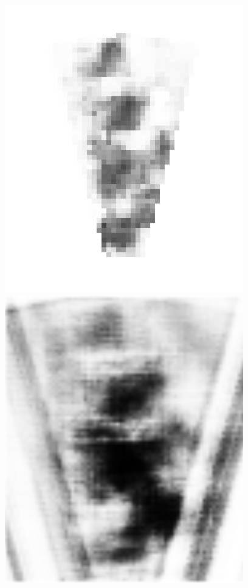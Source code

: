 \begin{figure}[!t]
{		\includegraphics[height=0.17\textheight]{chapters/images/proposals/unseen/heatmap-chain-gray.jpg}
		\includegraphics[height=0.17\textheight]{chapters/images/proposals/unseen/chain-frame00000-fcn.jpg}
	}


\end{figure}
